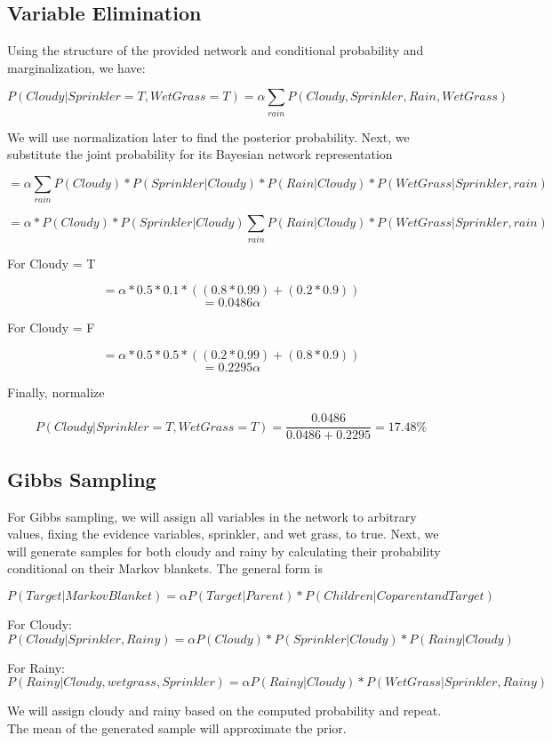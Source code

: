 \documentclass{article}
\begin{document}
\subsection{Variable Elimination}
Using the structure of the provided network and conditional probability and marginalization, we have:

\[ P(Cloudy | Sprinkler = T, WetGrass = T) = \alpha\sum_{rain} P(Cloudy, Sprinkler, Rain, Wet Grass)\]

We will use normalization later to find the posterior probability. Next, we substitute the joint probability for its Bayesian network representation

\[ = \alpha \sum_{rain} P(Cloudy) * P(Sprinkler | Cloudy) * P(Rain | Cloudy) * P(WetGrass | Sprinkler, rain)\]

\[ = \alpha * P(Cloudy) * P(Sprinkler | Cloudy) \sum_{rain} P(Rain | Cloudy) * P(WetGrass | Sprinkler, rain)\]

For Cloudy = T

\[ = \alpha * 0.5 * 0.1 * ((0.8 * 0.99) + (0.2 * 0.9))\]
\[ = 0.0486\alpha\]

For Cloudy = F

\[ = \alpha * 0.5 * 0.5 * ((0.2 * 0.99) + (0.8 * 0.9))\]
\[ = 0.2295\alpha\]

Finally, normalize

\[P(Cloudy | Sprinkler = T, WetGrass = T) = \frac{0.0486}{0.0486 + 0.2295} = 17.48 \%\]

\subsection{Gibbs Sampling}
For Gibbs sampling, we will assign all variables in the network to arbitrary values, fixing the evidence variables, sprinkler, and wet grass, to true. Next, we will generate samples for both cloudy and rainy by calculating their probability conditional on their Markov blankets. The general form is

\[ P(Target | Markov Blanket) = \alpha P(Target | Parent) * P(Children | Coparent and Target)\]

For Cloudy:
\[ P(Cloudy | Sprinkler, Rainy) = \alpha P( Cloudy) * P(Sprinkler | Cloudy) * P(Rainy | Cloudy)\]

For Rainy:
\[ P(Rainy | Cloudy, wetgrass, Sprinkler) = \alpha P(Rainy | Cloudy) * P(WetGrass | Sprinkler, Rainy)\]

We will assign cloudy and rainy based on the computed probability and repeat. The mean of the generated sample will approximate the prior.
\end{document}
